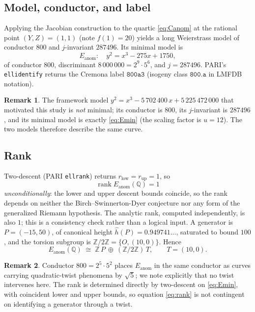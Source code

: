 \documentclass[11pt,reqno]{amsart}
\theoremstyle{plain}
\theoremstyle{definition}
\newtheorem{remark}{Remark}
\DeclareMathOperator{\rank}{rank}
\newcommand{\Q}{\mathbb{Q}}
\newcommand{\Z}{\mathbb{Z}}
\newcommand{\Eanom}{E_{\mathrm{anom}}}
\newcommand{\hath}{\widehat{h}}
\begin{document}
\subsection{Model, conductor, and label}
Applying the Jacobian construction to the quartic \eqref{eq:Canom} at the rational
point $(Y,Z)=(1,1)$ (note $f(1)=20$) yields a long Weierstrass model of conductor
$800$ and $j$-invariant $287496$. Its minimal model is
\begin{equation}\label{eq:Emin}
\Eanom\colon\quad y^{2}=x^{3}-275x+1750,
\end{equation}
of conductor $800$, discriminant $8\,000\,000=2^{9}\cdot 5^{6}$, and
$j=287496$. PARI's \texttt{ellidentify} returns the Cremona label $\mathtt{800a3}$
(isogeny class $\mathtt{800.a}$ in LMFDB notation).

\begin{remark}
The framework model $y^{2}=x^{3}-5\,702\,400\,x+5\,225\,472\,000$ that motivated this
study is \emph{not} minimal; its conductor is $800$, its $j$-invariant is $287496$, and
its minimal model is exactly \eqref{eq:Emin} (the scaling factor is $u=12$). The two
models therefore describe the same curve.
\end{remark}

\subsection{Rank}
Two-descent (PARI \texttt{ellrank}) returns $r_{\mathrm{low}}=r_{\mathrm{up}}=1$, so
\begin{equation}\label{eq:rank}
\rank \Eanom(\Q)=1
\end{equation}
\emph{unconditionally}: the lower and upper descent bounds coincide, so the rank
depends on neither the Birch--Swinnerton-Dyer conjecture nor any form of the
generalized Riemann hypothesis. The analytic rank, computed independently, is also
$1$; this is a consistency check rather than a logical input. A generator is
$P=(-15,50)$, of canonical height $\hath(P)=0.949741\ldots$, saturated to bound
$100$, and the torsion subgroup is $\Z/2\Z=\{O,(10,0)\}$. Hence
\begin{equation}\label{eq:MW}
\Eanom(\Q)\;\cong\;\Z\,P\ \oplus\ (\Z/2\Z)\,T,\qquad T=(10,0).
\end{equation}

\begin{remark}
Conductor $800=2^{5}\cdot 5^{2}$ places $\Eanom$ in the same conductor as curves carrying
quadratic-twist phenomena by $\sqrt{5}$; we note explicitly that no twist intervenes here.
The rank is determined directly by two-descent on \eqref{eq:Emin}, with coincident lower
and upper bounds, so equation \eqref{eq:rank} is not contingent on identifying a generator
through a twist.
\end{remark}
\end{document}
